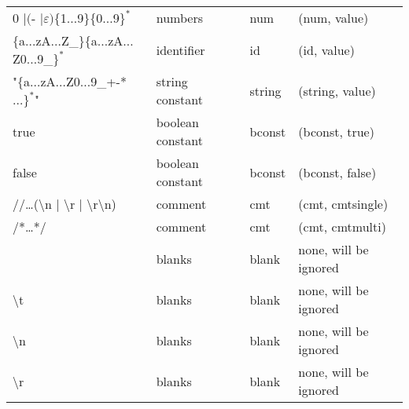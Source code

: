 \begin{solution}
\begin{enumerate}
\begin{longtable}{Llll}
      0 $\mid ($- $\mid \varepsilon)\{$1$\ldots$9$\}\{$0$\ldots$9$\}^\ast$ & numbers & num & (num, value) \\
      $\{$a$\ldots$zA$\ldots$Z\_$\}\{$a$\ldots$zA$\ldots$Z0$\ldots$9\_$\}^\ast$ & identifier & id & (id, value) \\
      "$\{$a$\ldots$zA$\ldots$Z0$\ldots$9\_\textvisiblespace+-*$\ldots\}^\ast$" & string constant & string & (string, value) \\
      true       & boolean constant & bconst & (bconst, true) \\
      false      & boolean constant & bconst & (bconst, false) \\

      //\textnormal{\ldots (}\textbackslash{}n $\mid$ \textbackslash{}r $\mid$ \textbackslash{}r\textbackslash{}n) & comment & cmt & (cmt, cmtsingle) \\
      /*\textnormal{\ldots}*/     & comment & cmt & (cmt, cmtmulti) \\
      \textvisiblespace  & blanks & blank & none, will be ignored \\
      \textbackslash{}t  & blanks & blank & none, will be ignored \\
      \textbackslash{}n  & blanks & blank & none, will be ignored \\
      \textbackslash{}r  & blanks & blank & none, will be ignored \\

      \hline
\end{longtable}


\end{enumerate}
\end{solution}
